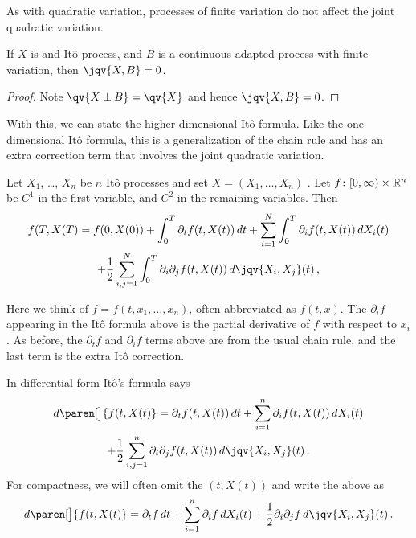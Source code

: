 As with quadratic variation, processes of finite variation do not affect the joint quadratic variation.
\begin{proposition}
  If $X$ is and It\^o process, and $B$ is a continuous adapted process with finite variation, then $\jqv{X,B} = 0$.
\end{proposition}
\begin{proof}
  Note $\qv{X\pm B} = \qv{X}$ and hence $\jqv{X, B} = 0$.
\end{proof}

With this, we can state the higher dimensional It\^o formula.
Like the one dimensional It\^o formula, this is a generalization of the chain rule and has an extra correction term that involves the joint quadratic variation.

\begin{theorem}
  Let $X_1$, \dots, $X_n$ be $n$ It\^o processes and set $X = (X_1, \dots, X_n)$ .
  Let $f\colon [0, \infty)\times \mathbb{R}^n$ be $C^1$ in the first variable, and $C^2$ in the remaining variables.
  Then
  \begin{multline*}
    f(T, X(T)
      = f(0, X(0))
	+ \int_0^T \partial_t f(t, X(t)) \, dt 
	+ \sum_{i=1}^{N} \int_0^T \partial_i f(t, X(t)) \, dX_i(t)
    \\
	+ \frac{1}{2} \sum_{i,j=1}^N \int_0^T \partial_i \partial_j f(t, X(t)) \, d\jqv{X_i, X_j}(t)\,,
  \end{multline*}
\end{theorem}
\begin{remark}
  Here we think of $f = f(t, x_1, \dots, x_n)$, often abbreviated as $f(t, x)$.
  The $\partial_i f$ appearing in the It\^o formula above is the partial derivative of $f$ with respect to $x_i$.
  As before, the $\partial_t f$ and $\partial_i f$ terms above are from the usual chain rule, and the last term is the extra It\^o correction.
\end{remark}
\begin{remark}
  In differential form It\^o's formula says
  \begin{multline*}
    d\paren[\big]{ f(t, X(t)}
      = \partial_t f(t, X(t)) \, dt 
	+ \sum_{i=1}^{n} \partial_i f(t, X(t)) \, dX_i(t)
    \\
	+ \frac{1}{2} \sum_{i,j = 1}^n
	  \partial_i \partial_j f(t, X(t)) \, d\jqv{X_i, X_j}(t)\,.
  \end{multline*}
  For compactness, we will often omit the $(t, X(t))$ and write the above as
  \begin{equation*}
    d\paren[\big]{ f(t, X(t)}
      = \partial_t f \, dt 
	+ \sum_{i=1}^{n} \partial_i f \, dX_i(t)
	+ \frac{1}{2} \partial_i \partial_j f \, d\jqv{X_i, X_j}(t)\,.
  \end{equation*}
\end{remark}
